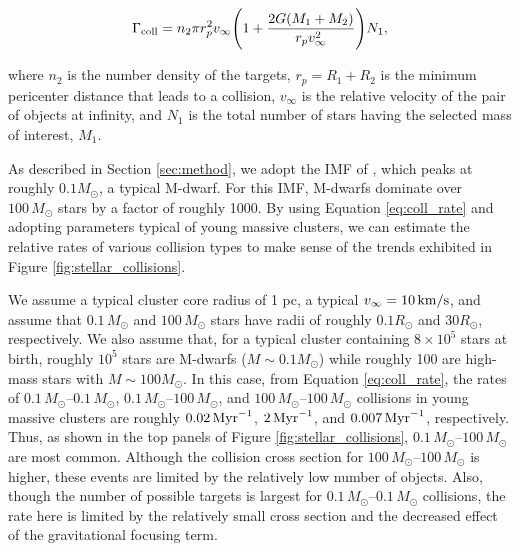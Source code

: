 \documentclass[twocolumn,tighten]{aastex63}
\begin{document}
\begin{equation}
\label{eq:coll_rate}
    \Gamma_{\rm{coll}} = n_2 \pi r_p^2 v_\infty \Bigg(1+\frac{2G(M_1+M_2)}{r_p v_\infty ^2} \Bigg) N_1,
\end{equation}

where $n_2$ is the number density of the targets, $r_p=R_1+R_2$ is the minimum pericenter distance that leads to a collision, $v_\infty$ is the relative velocity of the pair of objects at infinity, and $N_1$ is the total number of stars having the selected mass of interest, $M_1$.

As described in Section \ref{sec:method}, we adopt the IMF of \citet{Kroupa2001}, which peaks at roughly $0.1M_{\odot}$, a typical M-dwarf. For this IMF, M-dwarfs dominate over $100\,M_{\odot}$ stars by a factor of roughly 1000. By using Equation \ref{eq:coll_rate} and adopting parameters typical of young massive clusters, we can estimate the relative rates of various collision types to make sense of the trends exhibited in Figure \ref{fig:stellar_collisions}. 

We assume a typical cluster core radius of 1 pc, a typical $v_\infty=10\,\rm{km/s}$, and assume that $0.1\,M_{\odot}$ and $100\,M_{\odot}$ stars have radii of roughly $0.1R_{\odot}$ and $30R_{\odot}$, respectively. We also assume that, for a typical cluster containing $8\times10^5$ stars at birth, roughly $10^5$ stars are M-dwarfs ($M\sim0.1M_{\odot}$) while roughly 100 are high-mass stars with $M\sim 100M_{\odot}$. In this case, from Equation \ref{eq:coll_rate}, the rates of $0.1\,M_{\odot}$--$0.1\,M_{\odot}$, $0.1\,M_{\odot}$--$100\,M_{\odot}$, and $100\,M_{\odot}$--$100\,M_{\odot}$ collisions in young massive clusters are roughly $0.02\,\rm{Myr}^{-1}$, $2\,\rm{Myr}^{-1}$, and $0.007\,\rm{Myr}^{-1}$, respectively. Thus, as shown in the top panels of Figure \ref{fig:stellar_collisions}, $0.1\,M_{\odot}$--$100\,M_{\odot}$ are most common. Although the collision cross section for $100\,M_{\odot}$--$100\,M_{\odot}$ is higher, these events are limited by the relatively low number of objects. Also, though the number of possible targets is largest for $0.1\,M_{\odot}$--$0.1\,M_{\odot}$ collisions, the rate here is limited by the relatively small cross section and the decreased effect of the gravitational focusing term.
\end{document}
